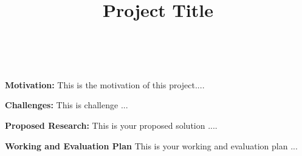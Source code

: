 \documentclass[12pt,journal,final,finalsubmission,onecolumn]{IEEEtran}
\begin{document}
\title{Project Title}

\author{ \\
}

\maketitle

\textbf{Motivation:} This is the motivation of this project....

\textbf{Challenges:} This is challenge ... 

\textbf{Proposed Research:} This is your proposed solution ....

\textbf{Working and Evaluation Plan} This is your working and evaluation plan ...
\end{document}
